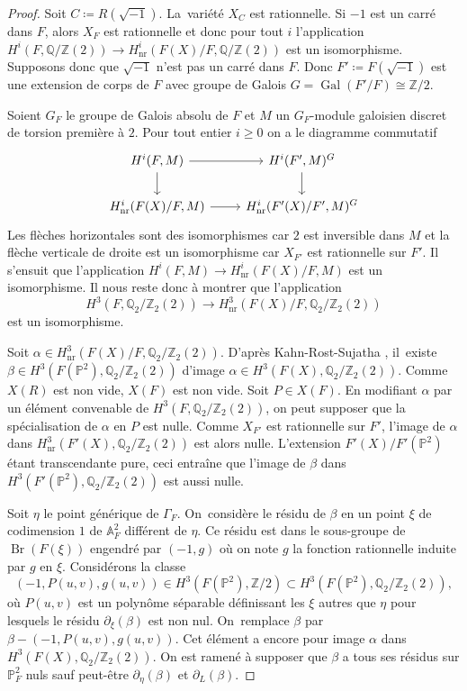 \documentclass[11pt]{article}
\theoremstyle{definition}
\newcommand{\Q}{\mathbb Q}
\newcommand{\Z}{\mathbb Z}
\newcommand{\A}{\mathbb A}
\renewcommand{\P}{\mathbb P}
\newcommand{\Br}{\operatorname{Br}}
\newcommand{\on}[1]{\operatorname{#1}}
\begin{document}
\begin{proof}
Soit $C\coloneqq R(\sqrt{-1})$. La~variété $X_{C}$ est rationnelle. Si $-1$ est un carré dans $F$, alors $X_F$ est rationnelle et donc pour tout $i$ l'application $H^i(F,\Q/\Z(2)) \to H^i_{\on{nr}}(F(X)/F,\Q/\Z(2))$ est un isomorphisme. Supposons donc que $\sqrt{-1}$ n'est pas un carré dans $F$. Donc $F'\coloneqq F(\sqrt{-1})$ est une extension de corps de $F$ avec groupe de Galois $G=\on{Gal}(F'/F)\cong \Z/2$.

Soient $G_F$ le groupe de Galois absolu de $F$ et $M$ un $G_F$-module galoisien discret de torsion première à $2$. Pour tout entier $i\geq 0$ on a le diagramme commutatif
\[
\begin{tikzcd}
H^i(F,M) \arrow[r]\arrow[d] & H^i(F',M)^G\arrow[d] \\
H^i_{\on{nr}}(F(X)/F,M) \arrow[r] & H^i_{\on{nr}}(F'(X)/F',M)^G
\end{tikzcd}
\]
Les flèches horizontales sont des isomorphismes car $2$ est inversible dans $M$ et la flèche verticale de droite est un isomorphisme car $X_{F'}$ est rationnelle sur $F'$. Il s'ensuit que l'application $H^i(F,M)\to H^i_{\on{nr}}(F(X)/F,M)$ est un isomorphisme.
Il nous reste donc à montrer que l'application \[H^3(F,\Q_2/\Z_2(2))\to H^3_{\on{nr}}(F(X)/F,\Q_2/\Z_2(2))\]
est un isomorphisme.

Soit $\alpha \in H^3_{\on{nr}}(F(X)/F,\Q_2/\Z_2(2))$. D'après Kahn-Rost-Sujatha \cite[Th.\,5]{kahn1998unramified}, il~existe $\beta \in H^3(F(\P^2), \Q_2/\Z_2(2))$ d'image $\alpha \in H^3(F(X),\Q_2/\Z_2(2))$. Comme $X(R)$ est non vide, $X(F)$ est non vide. Soit $P\in X(F)$. En modifiant $\alpha$ par un élément convenable de $H^3(F,\Q_2/\Z_2(2))$, on peut supposer que la spécialisation de $\alpha$ en $P$ est nulle. Comme $X_{F'}$ est rationnelle sur $F'$, l'image de $\alpha$ dans $H^3_{\on{nr}}(F'(X),\Q_2/\Z_2(2))$ est alors nulle. L'extension $F'(X)/F'(\P^2)$ étant transcendante pure, ceci entraîne que l'image de $\beta$ dans $H^3(F'(\P^2), \Q_2/\Z_2(2))$ est aussi nulle.

Soit $\eta$ le point générique de $\Gamma_F$. On~considère le résidu de $\beta$ en un point $\xi$
de codimension $1$ de $\A^2_{F}$ différent de $\eta$. Ce résidu est dans le sous-groupe de $\Br(F(\xi))$ engendré par $(-1,g)$ où on note $g$ la fonction rationnelle
induite par $g$ en $\xi$. Considérons la classe
\[(-1,P(u,v),g(u,v)) \in H^3(F(\P^2), \Z/2) \subset H^3(F(\P^2), \Q_2/\Z_2(2)),\]
où $P(u,v)$ est un polynôme séparable définissant
les $\xi$ autres que $\eta$ pour lesquels le résidu $\partial_{\xi}(\beta)$
est non nul. On~remplace $\beta$ par $\beta - (-1,P(u,v),g(u,v))$.
Cet élément a encore pour image $\alpha$ dans $H^3(F(X),\Q_2/\Z_2(2))$.
On est ramené à supposer que $\beta$ a tous ses résidus
sur $\P^2_{F}$ nuls sauf peut-être $\partial_{\eta}(\beta)$
et $\partial_{L}(\beta)$.


\end{proof}
\end{document}
